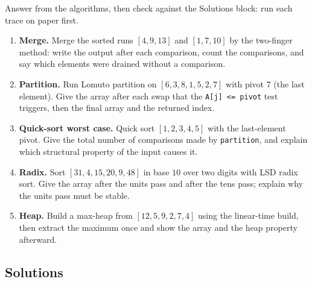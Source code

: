 \documentclass[11pt]{article}
\begin{document}
Answer from the algorithms, then check against the Solutions block: run each trace on paper first.
\begin{enumerate}
  \item \textbf{Merge.} Merge the sorted runs $[4,9,13]$ and $[1,7,10]$ by the two-finger method: write the output after each comparison, count the comparisons, and say which elements were drained without a comparison.
  \item \textbf{Partition.} Run Lomuto partition on $[6,3,8,1,5,2,7]$ with pivot $7$ (the last element). Give the array after each swap that the \texttt{A[j] <= pivot} test triggers, then the final array and the returned index.
  \item \textbf{Quick-sort worst case.} Quick sort $[1,2,3,4,5]$ with the last-element pivot. Give the total number of comparisons made by \texttt{partition}, and explain which structural property of the input causes it.
  \item \textbf{Radix.} Sort $[31,4,15,20,9,48]$ in base $10$ over two digits with LSD radix sort. Give the array after the units pass and after the tens pass; explain why the units pass must be stable.
  \item \textbf{Heap.} Build a max-heap from $[12,5,9,2,7,4]$ using the linear-time build, then extract the maximum once and show the array and the heap property afterward.
\end{enumerate}

\subsection*{Solutions}
\end{document}
